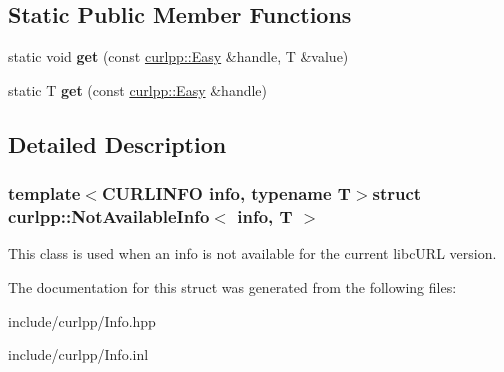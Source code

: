 \subsection*{Static Public Member Functions}
\begin{DoxyCompactItemize}
\item 
\hypertarget{structcurlpp_1_1NotAvailableInfo_ad1162412fd7d575f372ee45a6dd12ff9}{static void {\bfseries get} (const \hyperlink{classcurlpp_1_1Easy}{curlpp\-::\-Easy} \&handle, T \&value)}\label{structcurlpp_1_1NotAvailableInfo_ad1162412fd7d575f372ee45a6dd12ff9}

\item 
\hypertarget{structcurlpp_1_1NotAvailableInfo_a60b65edf75f13c3134a6b84bf028791e}{static T {\bfseries get} (const \hyperlink{classcurlpp_1_1Easy}{curlpp\-::\-Easy} \&handle)}\label{structcurlpp_1_1NotAvailableInfo_a60b65edf75f13c3134a6b84bf028791e}

\end{DoxyCompactItemize}


\subsection{Detailed Description}
\subsubsection*{template$<$C\-U\-R\-L\-I\-N\-F\-O info, typename T$>$struct curlpp\-::\-Not\-Available\-Info$<$ info, T $>$}

This class is used when an info is not available for the current libc\-U\-R\-L version. 

The documentation for this struct was generated from the following files\-:\begin{DoxyCompactItemize}
\item 
include/curlpp/Info.\-hpp\item 
include/curlpp/Info.\-inl\end{DoxyCompactItemize}
